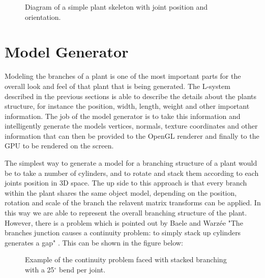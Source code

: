 \begin{figure}[htbp]
	{\centering
		\vspace{7px}
		\setlength{\fboxrule}{1pt}
		\caption{Diagram of a simple plant skeleton with joint position and orientation.} \label{skeleton diagram}
	}
\end{figure}
\FloatBarrier

\section{Model Generator}

Modeling the branches of a plant is one of the most important parts for the overall look and feel of that plant that is being generated. The L-system described in the previous sections is able to describe the details about the plants structure, for instance the position, width, length, weight and other important information. The job of the model generator is to take this information and intelligently generate the models vertices, normals, texture coordinates and other information that can then be provided to the OpenGL renderer and finally to the GPU to be rendered on the screen.

The simplest way to generate a model for a branching structure of a plant would be to take a number of cylinders, and to rotate and stack them according to each joints position in 3D space. The up side to this approach is that every branch within the plant shares the same object model, depending on the position, rotation and scale of the branch the relavent matrix transforms can be applied. In this way we are able to represent the overall branching structure of the plant. However, there is a problem which is pointed out by Baele and Warz\'{e}e "The branches junction causes a continuity problem: to simply stack up cylinders generates a gap" \cite{baele2005real}. This can be shown in the figure below:

\FloatBarrier

\begin{figure}[htbp]
	{\centering
		\vspace{7px}
		\setlength{\fboxrule}{1pt}
		\caption{Example of the continuity problem faced with stacked branching with a 25$^{\circ}$ bend per joint.}
	}
\end{figure}

\FloatBarrier

